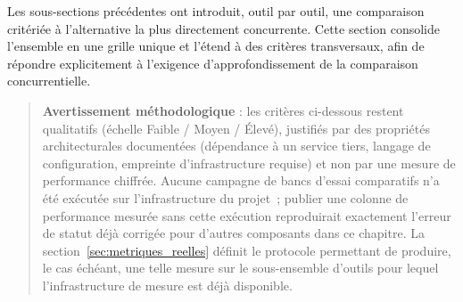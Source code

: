 Les sous-sections précédentes ont introduit, outil par outil, une comparaison critériée à l'alternative la plus directement concurrente. Cette section consolide l'ensemble en une grille unique et l'étend à des critères transversaux, afin de répondre explicitement à l'exigence d'approfondissement de la comparaison concurrentielle.

\begin{quote}
\textbf{Avertissement méthodologique} : les critères ci-dessous restent qualitatifs (échelle Faible / Moyen / Élevé), justifiés par des propriétés architecturales documentées (dépendance à un service tiers, langage de configuration, empreinte d'infrastructure requise) et non par une mesure de performance chiffrée. Aucune campagne de bancs d'essai comparatifs n'a été exécutée sur l'infrastructure du projet~; publier une colonne de performance mesurée sans cette exécution reproduirait exactement l'erreur de statut déjà corrigée pour d'autres composants dans ce chapitre. La section~\ref{sec:metriques_reelles} définit le protocole permettant de produire, le cas échéant, une telle mesure sur le sous-ensemble d'outils pour lequel l'infrastructure de mesure est déjà disponible.
\end{quote}

